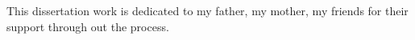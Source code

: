 \TAMUDedicationFormat
\begin{center}
\vspace*{\fill}
This dissertation work is dedicated to my father, my mother, my friends for their support through out the process.
\vspace*{\fill}
\end{center}


